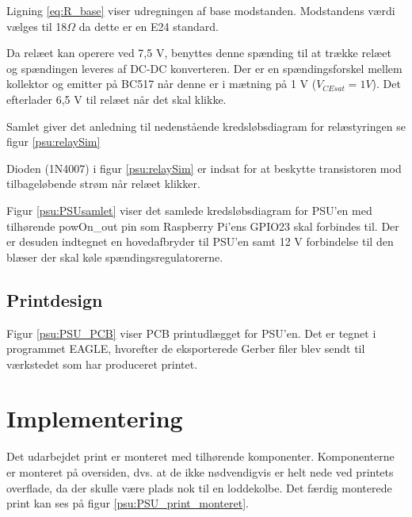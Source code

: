 Ligning \ref{eq:R_base} viser udregningen af base modstanden. Modstandens værdi vælges til 18$\Omega$ da dette er en E24 standard.  

Da relæet kan operere ved 7,5 V, benyttes denne spænding til at trække relæet og spændingen leveres af DC-DC konverteren. Der er en spændingsforskel mellem kollektor og emitter på BC517 når denne er i mætning på 1 V ($V_{CEsat} = 1 V$). Det efterlader 6,5 V til relæet når det skal klikke. 

Samlet giver det anledning til nedenstående kredsløbsdiagram for relæstyringen se figur \ref{psu:relaySim}


Dioden (1N4007) i figur \ref{psu:relaySim} er indsat for at beskytte transistoren mod tilbageløbende strøm når relæet klikker. 


Figur \ref{psu:PSUsamlet} viser det samlede kredsløbsdiagram for PSU'en med tilhørende powOn\_out pin som Raspberry Pi'ens GPIO23 skal forbindes til. Der er desuden indtegnet en hovedafbryder til PSU'en samt 12 V forbindelse til den blæser der skal køle spændingsregulatorerne.

\subsection*{Printdesign}

Figur \ref{psu:PSU_PCB} viser PCB printudlægget for PSU'en. Det er tegnet i programmet EAGLE, hvorefter de eksporterede Gerber filer blev sendt til værkstedet som har produceret printet. 


\section{Implementering}

Det udarbejdet print er monteret med tilhørende komponenter. Komponenterne er monteret på oversiden, dvs. at de  ikke nødvendigvis er helt nede ved printets overflade, da der skulle være plads nok til en loddekolbe. Det færdig monterede print kan ses på figur \ref{psu:PSU_print_monteret}.


